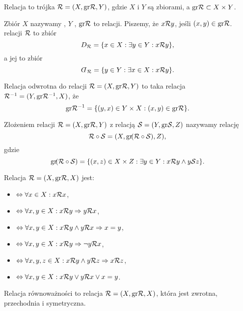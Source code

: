 \begin{definition}
    Relacja to trójka $\mathcal R = (X, \operatorname{gr}\!\mathcal R, Y)$, gdzie $X$ i $Y$ są zbiorami, a $\operatorname{gr}\! \mathcal R \subset X \times Y$.
\end{definition}

Zbiór $X$ nazywamy , $Y$ , $\operatorname{gr}\! \mathcal R$ to  relacji. Piszemy, że $x \mathcal R y$, jeśli $(x, y) \in \operatorname{gr}\!\mathcal R$.  relacji $\mathcal R$ to zbiór
$$ D_\mathcal R = \{x \in X : \exists y \in Y : x \mathcal R y\}, $$
a jej  to zbiór
$$ \rotatebox[origin=c]{180}{$D$}_\sR = \{y \in Y : \exists x \in X : x \sR y\}. $$

\begin{definition}
    Relacja odwrotna do relacji $\mathcal R = (X, \operatorname{gr}\!\mathcal R, Y)$ to taka relacja $\mathcal R^{-1} = (Y, \operatorname{gr}\!\mathcal R^{-1}, X)$, że
    $$ \operatorname{gr}\! \mathcal R^{-1} = \{(y, x) \in Y \times X : (x, y) \in \operatorname{gr}\!\mathcal R\}. $$
\end{definition}

\begin{definition}
    Złożeniem relacji $\mathcal R = (X, \operatorname{gr}\!\mathcal R, Y)$ z relacją $\mathcal S = (Y, \operatorname{gr}\!\mathcal S, Z)$ nazywamy relację
    $$ \mathcal R \circ \mathcal S = (X, \operatorname{gr}\!(\mathcal R \circ \mathcal S), Z), $$
    gdzie
    $$ \operatorname{gr}\!(\mathcal R \circ \mathcal S) = \{(x, z) \in X \times Z : \exists y \in Y : x \mathcal R y \wedge y \mathcal S z\}. $$
\end{definition}

\begin{definition}
    Relacja $\mathcal R = (X, \operatorname{gr}\!\mathcal R, X)$ jest:
    \begin{itemize}
        \item {} $\Leftrightarrow \forall x\in X : x \mathcal R x$,
        \item {} $\Leftrightarrow \forall x, y \in X : x \mathcal R y \Rightarrow y \mathcal R x$,
        \item {} $\Leftrightarrow \forall x, y \in X : x \mathcal R y \wedge y \mathcal R x \Rightarrow x = y$,
        \item {} $\Leftrightarrow \forall x, y \in X : x \mathcal R y \Rightarrow \neg y \mathcal R x$,
        \item {} $\Leftrightarrow \forall x, y, z \in X : x \mathcal R y \wedge y \mathcal R z \Rightarrow x \mathcal R z$,
        \item {} $\Leftrightarrow \forall x, y \in X : x \mathcal R y \vee y \mathcal R x \vee x = y$.
    \end{itemize}
\end{definition}

\begin{definition}
    Relacja równoważności to relacja $\mathcal R = (X, \operatorname{gr}\!\mathcal R, X)$, która jest zwrotna, przechodnia i symetryczna.
\end{definition}

